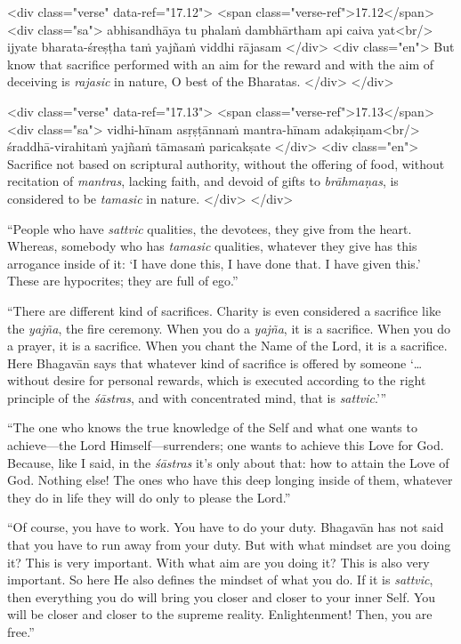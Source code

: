 \begin{html}
<div class="verse" data-ref="17.12">
  <span class="verse-ref">17.12</span>
  <div class="sa">
    abhisandhāya tu phalaṁ dambhārtham api caiva yat<br/>
    ijyate bharata-śreṣṭha taṁ yajñaṁ viddhi rājasam
  </div>
  <div class="en">
    But know that sacrifice performed with an aim for the reward and with the aim of deceiving is \textit{rajasic} in nature, O best of the Bharatas.
  </div>
</div>
\end{html}



\begin{html}
<div class="verse" data-ref="17.13">
  <span class="verse-ref">17.13</span>
  <div class="sa">
    vidhi-hīnam asṛṣṭānnaṁ mantra-hīnam adakṣiṇam<br/>
    śraddhā-virahitaṁ yajñaṁ tāmasaṁ paricakṣate
  </div>
  <div class="en">
    Sacrifice not based on scriptural authority, without the offering of food, without recitation of \textit{mantras}, lacking faith, and devoid of gifts to \textit{brāhmaṇas}, is considered to be \textit{tamasic} in nature.
  </div>
</div>
\end{html}


\enquote{People who have \textit{sattvic} qualities, the devotees, they give from the heart. Whereas, somebody who has \textit{tamasic} qualities, whatever they give has this arrogance inside of it: \enquote{I have done this, I have done that. I have given this.} These are hypocrites; they are full of ego.}

\enquote{There are different kind of sacrifices. Charity is even considered a sacrifice like the \textit{yajña}, the fire ceremony. When you do a \textit{yajña}, it is a sacrifice. When you do a prayer, it is a sacrifice. When you chant the Name of the Lord, it is a sacrifice. Here Bhagavān says that whatever kind of sacrifice is offered by someone \enquote{\ldots without desire for personal rewards, which is executed according to the right principle of the \textit{śāstras}, and with concentrated mind, that is \textit{sattvic}.}}

\enquote{The one who knows the true knowledge of the Self and what one wants to achieve---the Lord Himself---surrenders; one wants to achieve this Love for God. Because, like I said, in the \textit{śāstras} it’s only about that: how to attain the Love of God. Nothing else! The ones who have this deep longing inside of them, whatever they do in life they will do only to please the Lord.}

\enquote{Of course, you have to work. You have to do your duty. Bhagavān has not said that you have to run away from your duty. But with what mindset are you doing it? This is very important. With what aim are you doing it? This is also very important. So here He also defines the mindset of what you do. If it is \textit{sattvic}, then everything you do will bring you closer and closer to your inner Self. You will be closer and closer to the supreme reality. Enlightenment! Then, you are free.}

